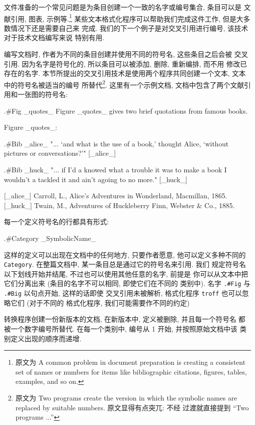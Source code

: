 文件准备的一个常见问题是为条目创建一个一致的名字或编号集合, 条目可以是
文献引用, 图表, 示例等.\footnote{原文为 A common problem in document
    preparation is creating a consistent set of names or numbers for items
like bibliographic citations, figures, tables, examples, and so on.}
某些文本格式化程序可以帮助我们完成这件工作, 但是大多数情况下还是需要自己来
完成. 我们的下一个例子是对交叉引用进行编号, 该技术对于技术文档编写来说
特别有用.

编写文档时, 作者为不同的条目创建并使用不同的符号名, 这些条目之后会被
交叉引用. 因为名字是符号化的, 所以条目可以被添加, 删除, 重新编排, 而不用
修改已存在的名字. 本节所提出的交叉引用技术是使用两个程序共同创建一个文本,
文本中的符号名被适当的编号
所替代\footnote{原文为 Two programs create the version in which the
symbolic names are replaced by suitable numbers. 原文显得有点突兀: 不经
过渡就直接提到 ``Two programs ...''}.
这里有一个示例文档, 文档中包含了两个文献引用和一张图的符号名:
\begin{awkcode}
    .#Fig _quotes_
    Figure _quotes_ gives two brief quotations from famous books.

                            Figure _quotes_:

    .#Bib _alice_
      "... `and what is the use of a book,' thought Alice,
      `without pictures or conversations?'" [_alice_]

    .#Bib _huck_
      "... if I'd a knowed what a trouble it was to make a book
      I wouldn't a tackled it and ain't agoing to no more." [_huck_]


    [_alice_] Carroll, L., Alice's Adventures in Wonderland,
        Macmillan, 1865.
    [_huck_] Twain, M., Adventures of Huckleberry Finn,
        Webster & Co., 1885.
\end{awkcode}
每一个定义符号名的行都具有形式:
\begin{awkcode}
    .#Category _SymbolicName_
\end{awkcode}
这样的定义可以出现在文档中的任何地方, 只要作者愿意, 他可以定义多种不同的
\texttt{Category}. 在整篇文档中, 某一条目总是通过它的符号名来引用. 我们 
规定符号名以下划线开始并结尾, 不过也可以使用其他任意的名字, 前提是
你可以从文本中把它们分离出来 (条目的名字不可以相同, 即使它们在不同的
类别中). 名字 \texttt{.\#Fig} 与 \texttt{.\#Big} 以句点开始, 这样的话即使
交叉引用未被解析, 格式化程序 \texttt{troff} 也可以忽略它们 (对于不同的
格式化程序, 我们可能需要作不同的约定)

转换程序创建一份新版本的文档, 在新版本中, 定义被删除, 并且每一个符号名
都被一个数字编号所替代. 在每一个类别中, 编号从 1 开始, 并按照原始文档中该
类别定义出现的顺序而递增. 


